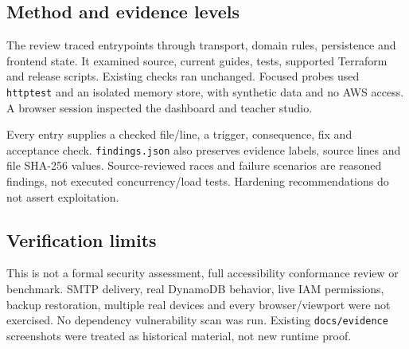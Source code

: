 \documentclass[11pt,a4paper]{article}
\begin{document}
\subsection{Method and evidence levels}
The review traced entrypoints through transport, domain rules, persistence and frontend state. It examined source, current guides, tests, supported Terraform and release scripts. Existing checks ran unchanged. Focused probes used \texttt{httptest} and an isolated memory store, with synthetic data and no AWS access. A browser session inspected the dashboard and teacher studio.

Every entry supplies a checked file/line, a trigger, consequence, fix and acceptance check. \texttt{findings.json} also preserves evidence labels, source lines and file SHA-256 values. Source-reviewed races and failure scenarios are reasoned findings, not executed concurrency/load tests. Hardening recommendations do not assert exploitation.
\subsection{Verification limits}
This is not a formal security assessment, full accessibility conformance review or benchmark. SMTP delivery, real DynamoDB behavior, live IAM permissions, backup restoration, multiple real devices and every browser/viewport were not exercised. No dependency vulnerability scan was run. Existing \texttt{docs/evidence} screenshots were treated as historical material, not new runtime proof.
\clearpage
\end{document}
